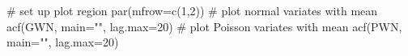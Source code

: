 \begin{Schunk}
\begin{Sinput}
 # set up plot region
 par(mfrow=c(1,2))
 # plot normal variates with mean
 acf(GWN, main="", lag.max=20)
 # plot Poisson variates with mean
 acf(PWN, main="", lag.max=20)
\end{Sinput}
\end{Schunk}
